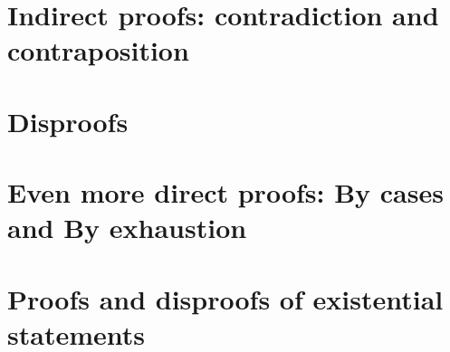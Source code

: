 \newpage

\section[Contradiction and contraposition]{Indirect proofs: contradiction and contraposition}
\label{sec:contra}




\newpage

\section{Disproofs}
\label{sec:disproofs}





\newpage

\section[By cases and By exhaustion]{Even more direct proofs: By cases and By exhaustion}
\label{sec:cases}





\newpage

\section[Existential statements]{Proofs and disproofs of existential statements}
\label{sec:exist}






%
%

 
